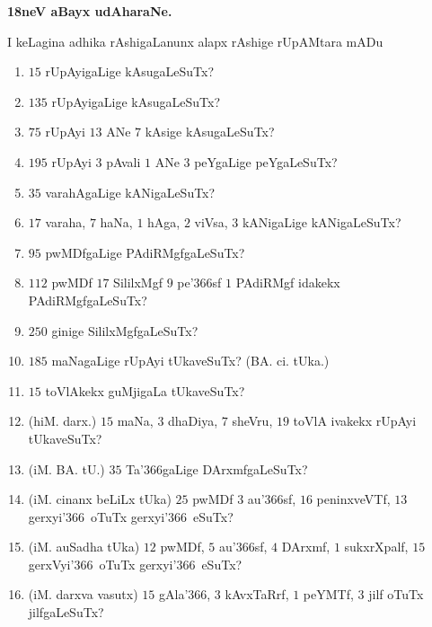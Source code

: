 \begin{center}
{\bf\Large {18neV aBayx udAharaNe.}}
\end{center}

I keLagina adhika rAshigaLanunx alapx rAshige rUpAMtara mADu

\begin{enumerate}[\rm(1)]
\item $15$ rUpAyigaLige kAsugaLeSuTx?

\item $135$ rUpAyigaLige kAsugaLeSuTx?

\item $75$ rUpAyi $13$ ANe $7$ kAsige kAsugaLeSuTx?

\item $195$ rUpAyi $3$ pAvali $1$ ANe $3$ peYgaLige peYgaLeSuTx?

\item $35$ varahAgaLige kANigaLeSuTx?

\item $17$ varaha, $7$ haNa, $1$ hAga, $2$ viVsa, $3$ kANigaLige kANigaLeSuTx?

\item $95$ pwMDfgaLige PAdiRMgfgaLeSuTx?

\item $112$ pwMDf $17$ SililxMgf $9$ pe\char'366sf $1$ PAdiRMgf idakekx PAdiRMgfgaLeSuTx?

\item $250$ ginige SililxMgfgaLeSuTx?

\item $185$ maNagaLige rUpAyi tUkaveSuTx? (BA. ci. tUka.)
\item $15$ toVlAkekx guMjigaLa tUkaveSuTx?

\item (hiM. darx.) $15$ maNa, $3$ dhaDiya, $7$ sheVru, $19$ toVlA ivakekx rUpAyi tUkaveSuTx?

\item (iM. BA. tU.) $35$ Ta\char'366gaLige DArxmfgaLeSuTx?

\item (iM. cinanx beLiLx tUka) $25$ pwMDf $3$ au\char'366sf, $16$ peninxveVTf, $13$ gerxyi\char'366\ oTuTx gerxyi\char'366\ eSuTx?

\item (iM. auSadha tUka) $12$ pwMDf, $5$ au\char'366sf, $4$ DArxmf, $1$ sukxrXpalf, $15$ gerxVyi\char'366\ oTuTx gerxyi\char'366\ eSuTx?
\item (iM. darxva vasutx) $15$ gAla\char'366, $3$ kAvxTaRrf, $1$ peYMTf, $3$ jilf oTuTx jilfgaLeSuTx?


\end{enumerate}
